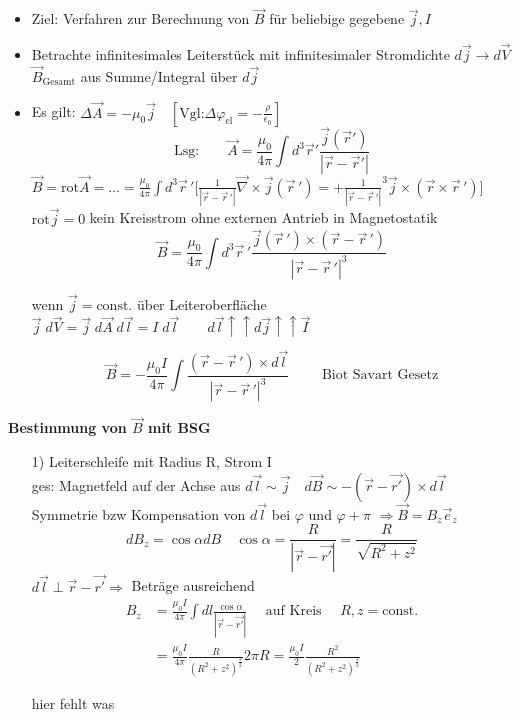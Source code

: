 \documentclass[titlepage,12pt,a4paper,ngerman]{report}
\newcommand{\tx}[1]{\textrm{#1}}
\newcommand{\const}{\tx{const.}}
\begin{document}
\begin{itemize}
	\item Ziel: Verfahren zur Berechnung von $ \vec{B} $ für beliebige gegebene $ \vec{j}, I $
	\item  Betrachte infinitesimales Leiterstück mit infinitesimaler Stromdichte $ d\vec{j} \rightarrow d \vec{V} $ \\
	$ \vec{B}_{\tx{Gesamt}} $ aus Summe/Integral über $ d\vec{j} $
	\item Es gilt: $ \Delta \vec{A} = -\mu_0 \vec{j} \quad [\tx{Vgl:} \Delta \varphi_{\tx{el}} = - \frac{\rho}{\epsilon_0}] $ \\
	$$\tx{Lsg:} \qquad  \vec{A} = \frac{ \mu_0}{4 \pi} \int d^3 \vec{r}' \frac{\vec{j} (\vec{r}')}{|\vec{r} - \vec{r}'|} $$
	$ \vec{B}  = \tx{rot} \vec{A} = \dots = \frac{\mu_0}{4 \pi} \int d^3 \vec{r}\,' \Big[ \frac{1}{|\vec{r} - \vec{r}\,'|} \vec{\nabla} \times \vec{j} (\vec{r}\,')= + \frac{1}{|\vec{r} - \vec{r}\,'|}^3 \vec{j} \times (\vec{r} \times \vec{r}\,')\Big] $\\
	$ \tx{rot} \vec{j} = 0 $ kein Kreisstrom ohne externen Antrieb in Magnetostatik
	$$\boxed{\vec{B} = \frac{\mu_0}{4\pi} \int d^3 \vec{r}\,' \frac{\vec{j} (\vec{r}\,') \times (\vec{r} - \vec{r}\,') }{| \vec{r} - \vec{r}\,'| ^3}}$$
	
	
	wenn $ \vec{j} = \const $ über Leiteroberfläche\\
	$ \vec{j} \; d\vec{V} = \vec{j} \; d\vec{A} \; d\vec{l} = I \; d\vec{l} \qquad d\vec{l} \uparrow \uparrow d\vec{j} \uparrow \uparrow \vec{I}$ 
	
	$$\boxed{\vec{B} = -\frac{\mu_0 I}{4\pi} \int \frac{(\vec{r} - \vec{r}\,') \times d\vec{l} }{| \vec{r} - \vec{r}\,'| ^3}} \qquad \tx{ Biot Savart Gesetz}$$
	
\end{itemize}
\textbf{Bestimmung von $ \vec{B} $ mit BSG}
\begin{itemize}
	\item[1)] Leiterschleife mit Radius R, Strom I\\
	ges: Magnetfeld auf der Achse aus $ d\vec{l} \sim \vec{j} \quad d \vec{B} \sim - (\vec{r} - \vec{r'}) \times d\vec{l} $\\
	Symmetrie bzw Kompensation von $ d\vec{l} $ bei $ \varphi $ und $\varphi + \pi$ $ \Rightarrow \vec{B} = B_z \vec{e}_z $\\
	$$ dB_z = \cos \alpha d B \quad \cos \alpha = \frac{R}{|\vec{r} - \vec{r'}|}  = \frac{R}{\sqrt{R^2 + z^2}}$$
	$ d\vec{l} \perp \vec{r} - \vec{r'} \Rightarrow $ Beträge ausreichend\\
	\begin{align*}
	B_z & = \frac{\mu_0 I }{4 \pi} \int d l \frac{\cos \alpha }{|\vec{r} - \vec{r'}|} \quad \tx{ auf Kreis } \quad R,z = \tx{const.} \\
	& = \frac{\mu_0 I }{4 \pi} \frac{R}{(R^2 + z^2 )^{\frac{3}{2}}} 2 \pi R = \frac{\mu_0 I }{2} \frac{ R^2}{(R^2 + z^2 ) ^{\frac{3}{2}}}
	\end{align*}
	
	hier fehlt was 
	
\end{itemize}
\end{document}
